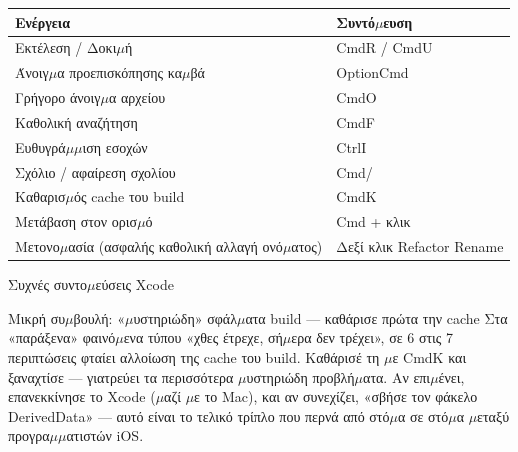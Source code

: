 
\begin{center}
\begin{tabularx}{\linewidth}{|X|X|}
\hline
\textbf{Ενέργεια} & \textbf{Συντό$\mu$ευση} \tabularnewline
\hline
Εκτέλεση / Δοκι$\mu$ή & CmdR / CmdU \tabularnewline
Άνοιγ$\mu$α προεπισκόπησης κα$\mu$βά & OptionCmd \tabularnewline
Γρήγορο άνοιγ$\mu$α αρχείου & CmdO \tabularnewline
Καθολική αναζήτηση & CmdF \tabularnewline
Ευθυγρά$\mu$$\mu$ιση εσοχών & CtrlI \tabularnewline
Σχόλιο / αφαίρεση σχολίου & Cmd/ \tabularnewline
Καθαρισ$\mu$ός cache του build & CmdK \tabularnewline
Μετάβαση στον ορισ$\mu$ό & Cmd + κλικ \tabularnewline
Μετονο$\mu$ασία (ασφαλής καθολική αλλαγή ονό$\mu$ατος) & Δεξί κλικ Refactor Rename \tabularnewline
\hline
\end{tabularx}
\end{center}

\begin{center}\small\color{gray}Συχνές συντο$\mu$εύσεις Xcode\end{center}

\begin{tcbinfo}{Μικρή συ$\mu$βουλή: «$\mu$υστηριώδη» σφάλ$\mu$ατα build — καθάρισε πρώτα την cache}
Στα «παράξενα» φαινό$\mu$ενα τύπου «χθες έτρεχε, σή$\mu$ερα δεν τρέχει», σε 6 στις 7 περιπτώσεις φταίει αλλοίωση της cache του build. Καθάρισέ τη $\mu$ε CmdK και ξαναχτίσε — γιατρεύει τα περισσότερα $\mu$υστηριώδη προβλή$\mu$ατα. Αν επι$\mu$ένει, επανεκκίνησε το Xcode ($\mu$αζί $\mu$ε το Mac), και αν συνεχίζει, «σβήσε τον φάκελο DerivedData» — αυτό είναι το τελικό τρίπλο που περνά από στό$\mu$α σε στό$\mu$α $\mu$εταξύ προγρα$\mu$$\mu$ατιστών iOS.

\end{tcbinfo}




